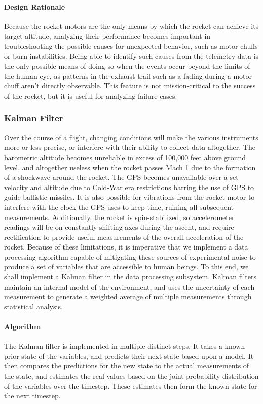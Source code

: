\documentclass[journal,10pt,onecolumn,compsoc]{IEEEtran}
\begin{document}
			\paragraph{Design Rationale}
				\noindent Because the rocket motors are the only means by which the rocket can achieve its target altitude, analyzing their performance becomes important in troubleshooting the possible causes for unexpected behavior, such as motor chuffs or burn instabilities.
				Being able to identify such causes from the telemetry data is the only possible means of doing so when the events occur beyond the limits of the human eye, as patterns in the exhaust trail such as a fading during a motor chuff aren't directly observable.
				This feature is not mission-critical to the success of the rocket, but it is useful for analyzing failure cases.
				
		\subsubsection{Kalman Filter}
			\noindent Over the course of a flight, changing conditions will make the various instruments more or less precise, or interfere with their ability to collect data altogether.
			The barometric altitude becomes unreliable in excess of 100,000 feet above ground level, and altogether useless when the rocket passes Mach 1 due to the formation of a shockwave around the rocket.
			The GPS becomes unavailable over a set velocity and altitude due to Cold-War era restrictions barring the use of GPS to guide ballistic missiles.
			It is also possible for vibrations from the rocket motor to interfere with the clock the GPS uses to keep time, ruining all subsequent measurements.
			Additionally, the rocket is spin-stabilized, so accelerometer readings will be on constantly-shifting axes during the ascent, and require rectification to provide useful measurements of the overall acceleration of the rocket.
			Because of these limitations, it is imperative that we implement a data processing algorithm capable of mitigating these sources of experimental noise to produce a set of variables that are accessible to human beings.
			To this end, we shall implement a Kalman filter in the data processing subsystem.
			Kalman filters maintain an internal model of the environment, and uses the uncertainty of each measurement to generate a weighted average of multiple measurements through statistical analysis.
			
			\paragraph{Algorithm}
				\noindent The Kalman filter is implemented in multiple distinct steps.
				It takes a known prior state of the variables, and predicts their next state based upon a model.
				It then compares the predictions for the new state to the actual measurements of the state, and estimates the real values based on the joint probability distribution of the variables over the timestep.
				These estimates then form the known state for the next timestep.
				
\end{document}
